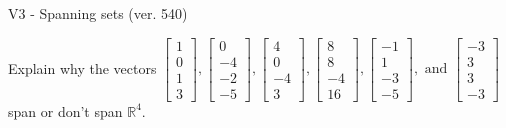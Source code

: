 \begin{exercise}
  \begin{exerciseTitle}V3 - Spanning sets (ver. 540)\end{exerciseTitle}
  \begin{exerciseStatement}
    Explain why the vectors \(\left[\begin{array}{r}
1 \\
0 \\
1 \\
3
\end{array}\right] , \left[\begin{array}{r}
0 \\
-4 \\
-2 \\
-5
\end{array}\right] , \left[\begin{array}{r}
4 \\
0 \\
-4 \\
3
\end{array}\right] , \left[\begin{array}{r}
8 \\
8 \\
-4 \\
16
\end{array}\right] , \left[\begin{array}{r}
-1 \\
1 \\
-3 \\
-5
\end{array}\right] , \text{ and } \left[\begin{array}{r}
-3 \\
3 \\
3 \\
-3
\end{array}\right]\) span or don't span \(\mathbb{R}^4\). 
	



\end{exerciseStatement}
\end{exercise}
